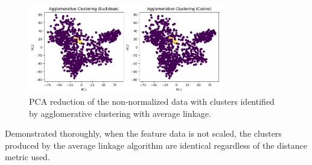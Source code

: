 \documentclass[11pt]{article}
\begin{document}
\begin{figure}[H]
    \centering
    \includegraphics[width=0.75\textwidth]{Images/non normal average linkage cluster visual.png}
    \caption{PCA reduction of the non-normalized data with clusters identified by agglomerative clustering with average linkage.}
    \label{fig:no_normal_cluster_visual_average_linkage}
\end{figure}

\vspace{-0.5cm}

Demonstrated thoroughly, when the feature data is not scaled, the clusters produced by the average linkage algorithm are identical regardless of the distance metric used. 
\end{document}
